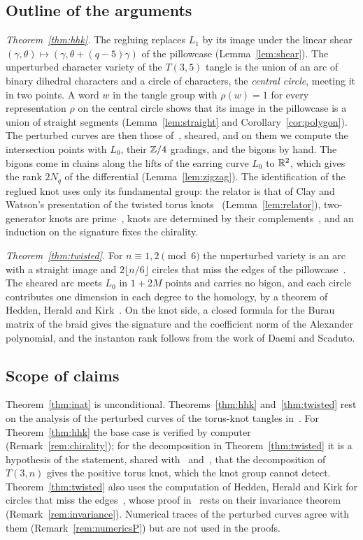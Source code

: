\subsection{Outline of the arguments}
\emph{Theorem~\ref{thm:hhk}.} The regluing replaces $L_1$ by its image under the linear shear
$(\gamma,\theta)\mapsto(\gamma,\theta+(q-5)\gamma)$ of the pillowcase (Lemma~\ref{lem:shear}). The unperturbed
character variety of the $T(3,5)$ tangle is the union of an arc of binary dihedral characters and a circle of characters, the \emph{central circle}, meeting it in two
points. A word $w$ in the tangle group with $\rho(w)=1$ for every representation $\rho$ on the central
circle shows that its image in the pillowcase is a union of straight segments (Lemma~\ref{lem:straight} and
Corollary~\ref{cor:polygon}). The perturbed curves are then those of~\cite{WuebbenV}, sheared, and on them
we compute the intersection points with $L_0$, their $\mathbb{Z}/4$ gradings, and the bigons by hand. The
bigons come in chains along the lifts of the earring curve $L_0$ to $\mathbb{R}^2$, which gives the rank $2N_q$ of the
differential (Lemma~\ref{lem:zigzag}). The identification of the reglued knot uses only its
fundamental group: the relator is that of Clay and Watson's presentation of the twisted torus
knots~\cite[Prop.~22]{ClayWatson} (Lemma~\ref{lem:relator}), two-generator knots are prime~\cite{Norwood},
knots are determined by their complements~\cite{GordonLuecke}, and an induction on the signature fixes the
chirality.

\emph{Theorem~\ref{thm:twisted}.} For $n\equiv1,2\pmod6$ the unperturbed variety is an arc with a straight
image and $2\lfloor n/6\rfloor$ circles that miss the edges of the pillowcase~\cite{WuebbenV}. The sheared
arc meets $L_0$ in $1+2M$ points and carries no bigon, and each circle contributes one dimension in each
degree to the homology, by a theorem of Hedden, Herald and Kirk~\cite[Thm.~5.4]{HHK2}. On the knot side, a closed formula for
the Burau matrix of the braid gives the signature and the coefficient norm of the Alexander polynomial,
and the instanton rank follows from the work of Daemi and Scaduto.

\subsection{Scope of claims}
Theorem~\ref{thm:inat} is unconditional. Theorems~\ref{thm:hhk} and~\ref{thm:twisted} rest on the analysis of
the perturbed curves of the torus-knot tangles in~\cite{WuebbenV}. For Theorem~\ref{thm:hhk} the base case is verified by
computer (Remark~\ref{rem:chirality}); for the decomposition in Theorem~\ref{thm:twisted} it is a hypothesis of the
statement, shared with~\cite{HHK2} and~\cite{WuebbenV}, that the decomposition of $T(3,n)$ gives the positive torus
knot, which the knot group cannot detect. Theorem~\ref{thm:twisted} also uses the
computation of Hedden, Herald and Kirk for circles that miss the edges~\cite[Thm.~5.4]{HHK2}, whose proof
in~\cite{HHK2} rests on their invariance theorem~\cite[Thm.~4.1]{HHK2} (Remark~\ref{rem:invariance}). Numerical traces of the perturbed
curves agree with them (Remark~\ref{rem:numericsP}) but are not used in the proofs.

